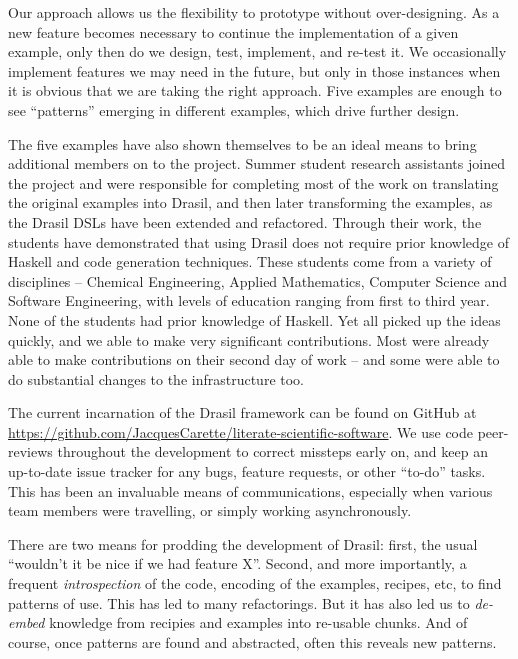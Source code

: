 \documentclass[sigconf]{acmart}
\begin{document}
Our approach allows us the flexibility to prototype without 
over-designing. As a new feature becomes necessary to continue the 
implementation of a given example, only then do we design, test, implement, and 
re-test it. We occasionally implement features we may need in the future, but 
only in those instances when it is obvious that we are taking the right 
approach.  Five examples are enough to see ``patterns'' emerging
in different examples, which drive further design.

The five examples have also shown themselves to be an ideal means to bring
additional members on to the project.  Summer student research assistants
joined the project and were responsible for completing most of the work on
translating the original examples into Drasil, and then later transforming the
examples, as the Drasil DSLs have been extended and refactored.  Through their
work, the students have demonstrated that using Drasil does not require prior
knowledge of Haskell and code generation techniques.  These students come from
a variety of disciplines -- Chemical Engineering, Applied Mathematics, Computer
Science and Software Engineering, with levels of education ranging from first
to third year. None of the students had prior knowledge of Haskell.  Yet all
picked up the ideas quickly, and we able to make very significant contributions.
Most were already able to make contributions on their second day of work -- and
some were able to do substantial changes to the infrastructure too.

The current incarnation of the Drasil framework can be found on GitHub at 
\href{https://github.com/JacquesCarette/literate-scientific-software}
{https://github.com/JacquesCarette/literate-scientific-software}. We use code
peer-reviews throughout the development to correct missteps early on, and 
keep an up-to-date issue tracker for any bugs, feature requests, or other 
``to-do'' tasks. This has been an invaluable means of communications, 
especially when various team members were travelling, or simply working
asynchronously.

There are two means for prodding the development of Drasil:  first, the
usual ``wouldn't it be nice if we had feature X''.  Second, and more
importantly, a frequent \emph{introspection} of the code, encoding of the
examples, recipes, etc, to find patterns of use.  This has led to many
refactorings.  But it has also led us to \emph{de-embed} knowledge from
recipies and examples into re-usable chunks.  And of course, once patterns
are found and abstracted, often this reveals new patterns.
\end{document}
